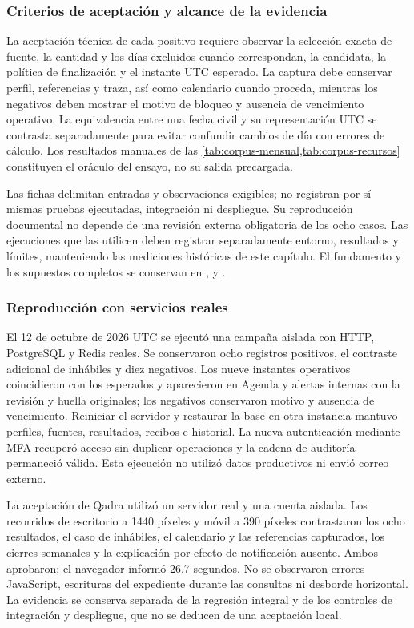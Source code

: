 \subsubsection{Criterios de aceptación y alcance de la evidencia}

La aceptación técnica de cada positivo requiere observar la selección exacta de fuente, la cantidad y los días excluidos cuando correspondan, la candidata, la política de finalización y el instante UTC esperado. La captura debe conservar perfil, referencias y traza, así como calendario cuando proceda, mientras los negativos deben mostrar el motivo de bloqueo y ausencia de vencimiento operativo. La equivalencia entre una fecha civil y su representación UTC se contrasta separadamente para evitar confundir cambios de día con errores de cálculo. Los resultados manuales de las \cref{tab:corpus-mensual,tab:corpus-recursos} constituyen el oráculo del ensayo, no su salida precargada.

Las fichas delimitan entradas y observaciones exigibles; no registran por sí mismas pruebas ejecutadas, integración ni despliegue. Su reproducción documental no depende de una revisión externa obligatoria de los ocho casos. Las ejecuciones que las utilicen deben registrar separadamente entorno, resultados y límites, manteniendo las mediciones históricas de este capítulo. El fundamento y los supuestos completos se conservan en ,  y .

\subsubsection{Reproducción con servicios reales}

El 12 de octubre de 2026 UTC se ejecutó una campaña aislada con HTTP, PostgreSQL y Redis reales. Se conservaron ocho registros positivos, el contraste adicional de inhábiles y diez negativos. Los nueve instantes operativos coincidieron con los esperados y aparecieron en Agenda y alertas internas con la revisión y huella originales; los negativos conservaron motivo y ausencia de vencimiento. Reiniciar el servidor y restaurar la base en otra instancia mantuvo perfiles, fuentes, resultados, recibos e historial. La nueva autenticación mediante MFA recuperó acceso sin duplicar operaciones y la cadena de auditoría permaneció válida. Esta ejecución no utilizó datos productivos ni envió correo externo.

La aceptación de Qadra utilizó un servidor real y una cuenta aislada. Los recorridos de escritorio a 1440 píxeles y móvil a 390 píxeles contrastaron los ocho resultados, el caso de inhábiles, el calendario y las referencias capturados, los cierres semanales y la explicación por efecto de notificación ausente. Ambos aprobaron; el navegador informó 26.7 segundos. No se observaron errores JavaScript, escrituras del expediente durante las consultas ni desborde horizontal. La evidencia se conserva separada de la regresión integral y de los controles de integración y despliegue, que no se deducen de una aceptación local.
